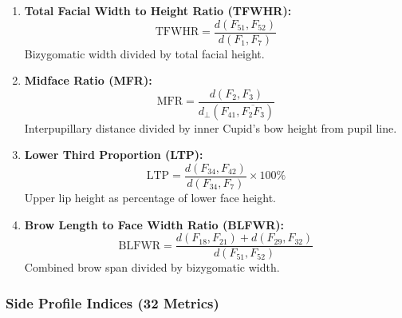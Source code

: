 \begin{enumerate}[resume]
    \item \textbf{Total Facial Width to Height Ratio (TFWHR):}
    \begin{equation}
    \text{TFWHR} = \frac{d(F_{51}, F_{52})}{d(F_1, F_7)}
    \end{equation}
    Bizygomatic width divided by total facial height.
    
    \item \textbf{Midface Ratio (MFR):}
    \begin{equation}
    \text{MFR} = \frac{d(F_2, F_3)}{d_\perp(F_{41}, \overline{F_2F_3})}
    \end{equation}
    Interpupillary distance divided by inner Cupid's bow height from pupil line.
    
    \item \textbf{Lower Third Proportion (LTP):}
    \begin{equation}
    \text{LTP} = \frac{d(F_{34}, F_{42})}{d(F_{34}, F_7)} \times 100\%
    \end{equation}
    Upper lip height as percentage of lower face height.
    
    \item \textbf{Brow Length to Face Width Ratio (BLFWR):}
    \begin{equation}
    \text{BLFWR} = \frac{d(F_{18}, F_{21}) + d(F_{29}, F_{32})}{d(F_{51}, F_{52})}
    \end{equation}
    Combined brow span divided by bizygomatic width.
\end{enumerate}

\subsubsection{Side Profile Indices (32 Metrics)}

